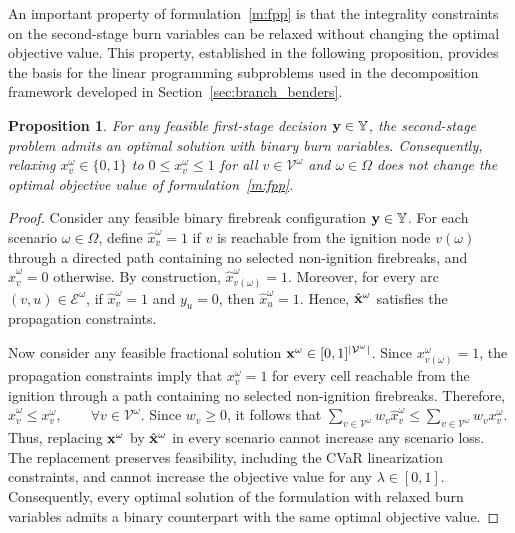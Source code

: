 \documentclass[a4paper,fleqn]{cas-sc}
\newtheorem{proposition}{Proposition}
\begin{document}
An important property of formulation~\eqref{m:fpp}
is that the integrality constraints on the second-stage burn variables can be relaxed without
changing the optimal objective value. This property,
established in the following proposition, provides
the basis for the linear programming subproblems
used in the decomposition framework developed
in Section~\ref{sec:branch_benders}.

\begin{proposition}
\label{prop:integrality_recourse}
For any feasible first-stage decision
$\vb{y}\in\mathbb{Y}$, the second-stage problem
admits an optimal solution with binary burn
variables. Consequently, relaxing
$x_v^\omega\in\{0,1\}$ to
$0\leq x_v^\omega\leq1$
for all $v\in\mathcal{V}^\omega$ and
$\omega\in\Omega$ does not change the
optimal objective value of
formulation~\eqref{m:fpp}.
\end{proposition}

\begin{proof}
Consider any feasible binary firebreak configuration
$\vb{y}\in\mathbb{Y}$. For each scenario
$\omega\in\Omega$, define
$\hat{x}_v^\omega=1$ if $v$ is reachable from
the ignition node $v(\omega)$ through a directed
path containing no selected non-ignition
firebreaks, and $\hat{x}_v^\omega=0$ otherwise. By construction,
$\hat{x}_{v(\omega)}^\omega=1$.
Moreover, for every arc
$(v,u)\in\mathcal{E}^\omega$, if
$\hat{x}_v^\omega=1$ and $y_u=0$, then
$\hat{x}_u^\omega=1$. Hence,
$\hat{\vb{x}}^\omega$ satisfies the
propagation constraints.

Now consider any feasible fractional solution
$\vb{x}^\omega\in[0,1]^{|\mathcal{V}^\omega|}$.
Since $x_{v(\omega)}^\omega=1$, the propagation
constraints imply that $x_v^\omega=1$
for every cell reachable from the ignition
through a path containing no selected
non-ignition firebreaks. Therefore, 
$\hat{x}_v^\omega\leq x_v^\omega,
\qquad
\forall v\in\mathcal{V}^\omega$. 
Since $w_v\geq0$, it follows that $\sum_{v\in\mathcal{V}^\omega}
w_v\hat{x}_v^\omega
\leq
\sum_{v\in\mathcal{V}^\omega}
w_vx_v^\omega$. Thus, replacing $\vb{x}^\omega$ by
$\hat{\vb{x}}^\omega$ in every scenario
cannot increase any scenario loss.
The replacement preserves feasibility,
including the CVaR linearization
constraints, and cannot increase the
objective value for any $\lambda\in[0,1]$. Consequently, every optimal solution
of the formulation with relaxed burn
variables admits a binary counterpart
with the same optimal objective value.
\end{proof}
\end{document}
